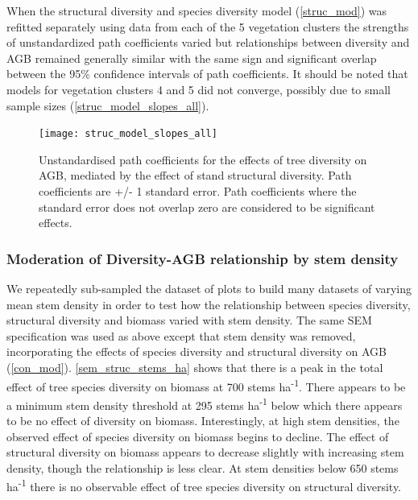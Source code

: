 \documentclass[11pt,a4paper]{article}
\begin{document}
When the structural diversity and species diversity model (\autoref{struc_mod}) was refitted separately using data from each of the 5 vegetation clusters the strengths of unstandardized path coefficients varied but relationships between diversity and AGB remained generally similar with the same sign and significant overlap between the 95\% confidence intervals of path coefficients. It should be noted that models for vegetation clusters 4 and 5 did not converge, possibly due to small sample sizes (\autoref{struc_model_slopes_all}).

\begin{figure}[H]
\centering
	\texttt{[image: struc\_model\_slopes\_all]}
	\caption{Unstandardised path coefficients for the effects of tree diversity on AGB, mediated by the effect of stand structural diversity. Path coefficients are +/- 1 standard error. Path coefficients where the standard error does not overlap zero are considered to be significant effects.}
	\label{struc_model_slopes_all}
\end{figure}




\subsubsection{Moderation of Diversity-AGB relationship by stem density}

We repeatedly sub-sampled the dataset of plots to build many datasets of varying mean stem density in order to test how the relationship between species diversity, structural diversity and biomass varied with stem density. The same SEM specification was used as above except that stem density was removed, incorporating the effects of species diversity and structural diversity on AGB (\autoref{con_mod}).  \autoref{sem_struc_stems_ha} shows that there is a peak in the total effect of tree species diversity on biomass at \textapprox{}700 stems ha\textsuperscript{-1}. There appears to be a minimum stem density threshold at \textapprox{}295 stems ha\textsuperscript{-1} below which there appears to be no effect of diversity on biomass. Interestingly, at high stem densities, the observed effect of species diversity on biomass begins to decline. The effect of structural diversity on biomass appears to decrease slightly with increasing stem density, though the relationship is less clear. At stem densities below \textapprox{}650 stems ha\textsuperscript{-1}  there is no observable effect of tree species diversity on structural diversity.
\end{document}
